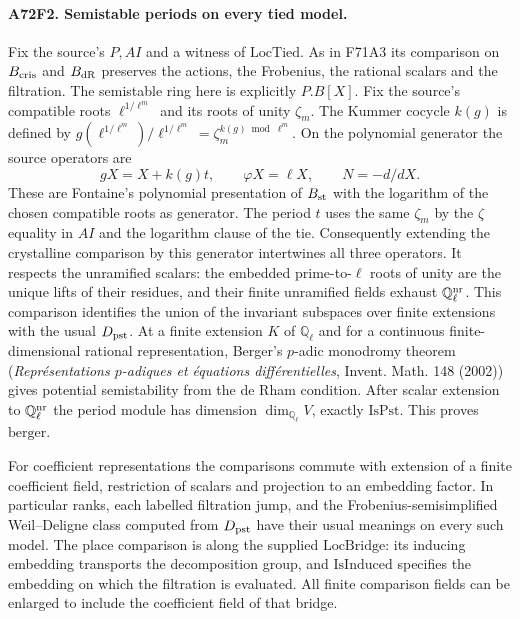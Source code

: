 \paragraph{A72F2. Semistable periods on every tied model.}
Fix the source's $P,AI$ and a witness of $\mathrm{LocTied}$.
As in F71A3 its comparison on $B_{\rm cris}$ and $B_{\rm dR}$
preserves the actions, the Frobenius, the rational scalars and the
filtration. The semistable ring here is explicitly $P.B[X]$.
Fix the source's compatible roots $\ell^{1/\ell^m}$ and its
roots of unity $\zeta_m$. The Kummer cocycle $k(g)$ is defined by
$g(\ell^{1/\ell^m})/\ell^{1/\ell^m}=\zeta_m^{k(g)\bmod\ell^m}$.
On the polynomial generator the source operators are
\[
  gX=X+k(g)t,\qquad \varphi X=\ell X,\qquad N=-d/dX .
\]
These are Fontaine's polynomial presentation of $B_{\rm st}$ with
the logarithm of the chosen compatible roots as generator. The
period $t$ uses the same $\zeta_m$ by the $\zeta$ equality in
$AI$ and the logarithm clause of the tie. Consequently extending
the crystalline comparison by this generator intertwines all three
operators. It respects the unramified scalars: the embedded
prime-to-$\ell$ roots of unity are the unique lifts of their
residues, and their finite unramified fields exhaust
$\mathbb Q_\ell^{\rm nr}$. This comparison identifies the union
of the invariant subspaces over finite extensions with the
usual $D_{\rm pst}$. At a finite extension $K$ of $\mathbb Q_\ell$
and for a continuous finite-dimensional rational representation,
Berger's $p$-adic monodromy theorem (\emph{Repr\'esentations
$p$-adiques et \'equations diff\'erentielles}, Invent. Math.
148 (2002)) gives potential semistability from the de Rham
condition. After scalar extension to $\mathbb Q_\ell^{\rm nr}$
the period module has dimension $\dim_{\mathbb Q_\ell}V$,
exactly $\mathrm{IsPst}$. This proves $\mathrm{berger}$.

For coefficient representations the comparisons commute with
extension of a finite coefficient field, restriction of scalars
and projection to an embedding factor. In particular ranks, each
labelled filtration jump, and the Frobenius-semisimplified
Weil--Deligne class computed from $D_{\rm pst}$ have their
usual meanings on every such model. The place comparison is along
the supplied $\mathrm{LocBridge}$: its inducing embedding transports
the decomposition group, and $\mathrm{IsInduced}$ specifies the
embedding on which the filtration is evaluated. All finite comparison
fields can be enlarged to include the coefficient field of that
bridge.

